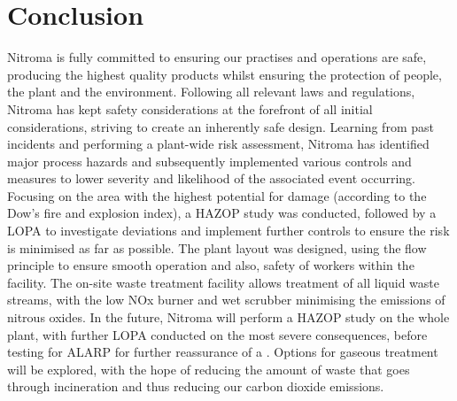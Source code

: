 \section{Conclusion}

Nitroma is fully committed to ensuring our practises and operations are safe, producing the highest quality products whilst ensuring the protection of people, the plant and the environment. Following all relevant laws and regulations, Nitroma has kept safety considerations at the forefront of all initial considerations, striving to create an inherently safe design. Learning from past incidents and performing a plant-wide risk assessment, Nitroma has identified major process hazards and subsequently implemented various controls and measures to lower severity and likelihood of the associated event occurring. Focusing on the area with the highest potential for damage (according to the Dow’s fire and explosion index), a HAZOP study was conducted, followed by a LOPA to investigate deviations and implement further controls to ensure the risk is minimised as far as possible. The plant layout was designed, using the flow principle to ensure smooth operation and also, safety of workers within the facility. The on-site waste treatment facility allows treatment of all liquid waste streams, with the low NOx burner and wet scrubber minimising the emissions of nitrous oxides. In the future, Nitroma will perform a HAZOP study on the whole plant, with further LOPA conducted on the most severe consequences, before testing for ALARP for further reassurance of a . Options for gaseous treatment will be explored, with the hope of reducing the amount of waste that goes through incineration and thus reducing our carbon dioxide emissions. 